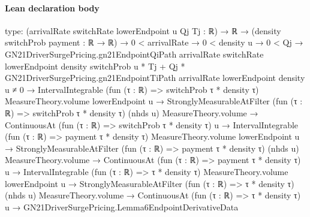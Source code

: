 \documentclass[10pt]{article}
\begin{document}
\paragraph{Lean declaration body}
\begin{ReviewVerbatim}
type:
(arrivalRate switchRate lowerEndpoint u Qj Tj : ℝ) →
  ℝ →
    (density switchProb payment : ℝ → ℝ) →
      0 < arrivalRate →
        0 < density u →
          0 < Qj →
            GN21DriverSurgePricing.gn21EndpointQiPath arrivalRate switchRate lowerEndpoint density switchProb u * Tj +
                  Qj * GN21DriverSurgePricing.gn21EndpointTiPath arrivalRate lowerEndpoint density u ≠
                0 →
              IntervalIntegrable (fun (τ : ℝ) => switchProb τ * density τ) MeasureTheory.volume lowerEndpoint u →
                StronglyMeasurableAtFilter (fun (τ : ℝ) => switchProb τ * density τ) (nhds u) MeasureTheory.volume →
                  ContinuousAt (fun (τ : ℝ) => switchProb τ * density τ) u →
                    IntervalIntegrable (fun (τ : ℝ) => payment τ * density τ) MeasureTheory.volume lowerEndpoint u →
                      StronglyMeasurableAtFilter (fun (τ : ℝ) => payment τ * density τ) (nhds u) MeasureTheory.volume →
                        ContinuousAt (fun (τ : ℝ) => payment τ * density τ) u →
                          IntervalIntegrable (fun (τ : ℝ) => τ * density τ) MeasureTheory.volume lowerEndpoint u →
                            StronglyMeasurableAtFilter (fun (τ : ℝ) => τ * density τ) (nhds u) MeasureTheory.volume →
                              ContinuousAt (fun (τ : ℝ) => τ * density τ) u →
                                GN21DriverSurgePricing.Lemma6EndpointDerivativeData


\end{ReviewVerbatim}
\end{document}
